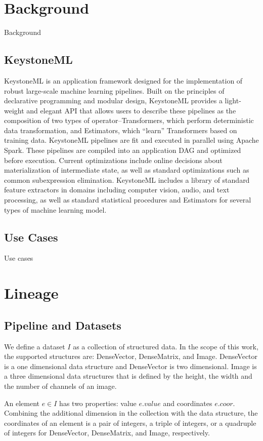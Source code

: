 \documentclass{sig-alternate}
\begin{document}
\section{Background}
\label{sec:Background}
Background

\subsection{KeystoneML}
KeystoneML is an application framework designed for the implementation of robust large-scale machine learning pipelines. Built on the principles of declarative programming and modular design, KeystoneML provides a light-weight and elegant API that allows users to describe these pipelines as the composition of two types of operator--Transformers, which perform deterministic data transformation, and Estimators, which ``learn'' Transformers based on training data. KeystoneML pipelines are fit and executed in parallel using Apache Spark. These pipelines are compiled into an application DAG and optimized before execution. Current optimizations include online decisions about materialization of intermediate state, as well as standard optimizations such as common subexpression elimination. KeystoneML includes a library of standard feature extractors in domains including computer vision, audio, and text processing, as well as standard statistical procedures and Estimators for several types of machine learning model.

\subsection{Use Cases}
Use cases

\section{Lineage}
\label{sec:Lin}
\subsection{Pipeline and Datasets}
We define a dataset $I$ as a collection of structured data. In the scope of this work, the supported structures are: 
DenseVector, DenseMatrix, and Image. DenseVector is a one dimensional data structure and DenseVector is
two dimensional. Image is a three dimensional data structures that is defined by the height, the width and the number
of channels of an image. 

An element $e \in I$ has two properties: value $e.value$ and coordinates $e.coor$. 
Combining the additional dimension in the collection with the data structure, 
the coordinates of an element is a pair of integers, a triple of integers, or a quadruple of integers
for DenseVector, DenseMatrix, and Image, respectively.
\end{document}
